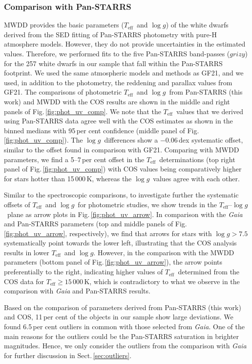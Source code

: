 \documentclass[fleqn,usenatbib, useAMS]{mnras}
\newcommand{\Teff}{\mbox{$T_{\mathrm{eff}}$}}
\newcommand{\logg}{\mbox{$\log g$}}
\begin{document}
\subsubsection{Comparison with Pan-STARRS}
\label{sec:panstarrs}
MWDD \citep{mwdd} provides the basic parameters (\Teff\ and \logg) of the white dwarfs derived from the SED fitting of Pan-STARRS photometry with pure-H atmosphere models. However, they do not provide uncertainties in the estimated values. Therefore, we performed fits to the five Pan-STARRS band-passes ($grizy$) for the 257 white dwarfs in our sample that fall within the Pan-STARRS footprint. We used the same atmospheric models and methods as GF21, and we used, in addition to the photometry, the reddening and parallax values from GF21. The comparisons of photometric \Teff\ and \logg\ from Pan-STARRS (this work) and MWDD with the COS results are shown in the middle and right panels of Fig.\,\ref{fig:phot_uv_comp}. We note that the \Teff\ values that we derived using Pan-STARRS data agree well with the COS estimates as shown in the binned medians with 95\,per cent confidence (middle panel of Fig.\,\ref{fig:phot_uv_comp}). The \logg\ differences show a $-0.06$\,dex systematic offset, similar to the offset found in comparison with GF21. Comparing with MWDD parameters, we find a 5--7\,per cent offset in the \Teff\ determinations (top right panel of Fig.\,\ref{fig:phot_uv_comp}) with COS values being comparatively higher for stars hotter than 15\,000\,K, whereas the \logg\ values agree with each other.

Similar to the spectroscopic comparisons, to investigate further the systematic offsets of \Teff\ and \logg\ for photometric studies, we show trends in the \Teff--\logg\ plane as arrow plots in Fig.\,\ref{fig:phot_uv_arrow}. In comparison with the \textit{Gaia} and Pan-STARRS parameters (top and middle panels of Fig.\,\ref{fig:phot_uv_arrow}, respectively), we find that arrows for stars with $\log g>7.5$ systematically point towards the lower left, illustrating that the COS analysis results in lower \Teff\ and \logg. However, in  the comparison with the MWDD parameters (bottom panel of Fig.\,\ref{fig:phot_uv_arrow}), the arrow points preferentially to the right, indicating higher values of \Teff\ determined from the COS data for $\Teff\geq15\,000$\,K, which is contradictory to what we observe in the comparison with \textit{Gaia} and Pan-STARRS results.

Based on the comparison of parameters derived from Pan-STARRS (this work) and COS, 11\,per cent of the objects in our sample show large deviations. We found 6.5\,per cent outliers in common with those selected from \textit{Gaia}. One of the main reasons for the outliers could be the Pan-STARRS saturation in brighter magnitudes. Hence, we only consider the outliers from the comparison with \textit{Gaia} for further discussion in Sect.\,\ref{sec:outliers}.
\end{document}
